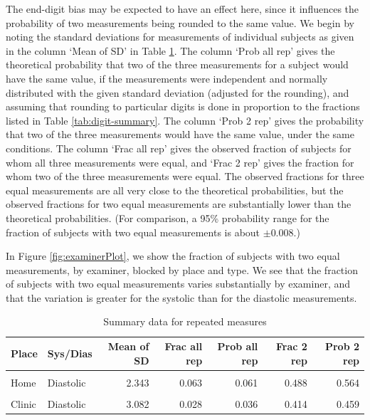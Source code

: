 \documentclass[
]{article}
\begin{document}
The end-digit bias may be expected to have an effect here, since it influences the probability of two measurements being rounded to the same value.
We begin by noting the standard deviations for measurements of individual subjects as given in the column `Mean of SD' in Table \ref{tab:sd-summary}.
The column `Prob all rep' gives the theoretical probability that two of the three measurements for a subject would have the same value, if the measurements were independent and normally distributed with the given standard deviation (adjusted for the rounding), and assuming that rounding to particular digits is done in proportion to the fractions listed in Table \ref{tab:digit-summary}.
The column `Prob 2 rep' gives the probability that two of the three measurements would have the same value, under the same conditions.
The column `Frac all rep' gives the observed fraction of subjects for whom all three measurements were equal, and `Frac 2 rep' gives the fraction for whom two of the three measurements were equal.
The observed fractions for three equal measurements are all very close to the theoretical probabilities, but the observed fractions for two equal measurements are substantially lower than the theoretical probabilities.
(For comparison, a 95\% probability range for the fraction of subjects with two equal measurements is about \(\pm 0.008\).)

In Figure \ref{fig:examinerPlot}, we show the fraction of subjects with two equal measurements, by examiner, blocked by place and type.
We see that the fraction of subjects with two equal measurements varies substantially by examiner, and that the variation is greater for the systolic than for the diastolic measurements.

\begin{table}[!h]

\caption{\label{tab:sd-summary}Summary data for repeated measures}
\centering
\begin{tabular}[t]{llrrrrr}
\toprule
Place & Sys/Dias & Mean of SD & Frac all rep & Prob all rep & Frac 2 rep & Prob 2 rep\\
\midrule
\cellcolor{gray!6}{Home} & \cellcolor{gray!6}{Systolic} & \cellcolor{gray!6}{2.739} & \cellcolor{gray!6}{0.050} & \cellcolor{gray!6}{0.048} & \cellcolor{gray!6}{0.432} & \cellcolor{gray!6}{0.510}\\
Home & Diastolic & 2.343 & 0.063 & 0.061 & 0.488 & 0.564\\
\cellcolor{gray!6}{Clinic} & \cellcolor{gray!6}{Systolic} & \cellcolor{gray!6}{3.775} & \cellcolor{gray!6}{0.024} & \cellcolor{gray!6}{0.028} & \cellcolor{gray!6}{0.355} & \cellcolor{gray!6}{0.400}\\
Clinic & Diastolic & 3.082 & 0.028 & 0.036 & 0.414 & 0.459\\
\bottomrule
\end{tabular}
\end{table}
\end{document}
